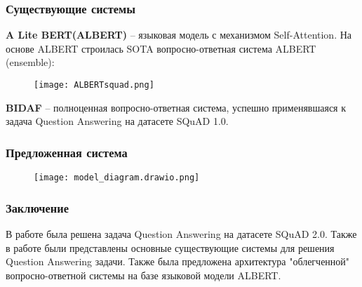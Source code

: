 \documentclass[xcolor={dvipsnames}]{beamer}
\begin{document}
\begin{frame}
\frametitle{Существующие системы}
\textbf{A Lite BERT(ALBERT)} -- языковая модель с механизмом Self-Attention. На основе ALBERT строилась SOTA вопросно-ответная система ALBERT (ensemble):

\begin{figure}[!ht]
    \centering
    \texttt{[image: ALBERTsquad.png]}
\end{figure}

\textbf{BIDAF} -- полноценная вопросно-ответная система, успешно применявшаяся к задача Question Answering на датасете SQuAD 1.0.
\end{frame}

\begin{frame}
\frametitle{Предложенная система}
\begin{figure}[!ht]
    \centering
    \texttt{[image: model\_diagram.drawio.png]}
\end{figure}
\end{frame}

\begin{frame}
\frametitle{Заключение}
В работе была решена задача Question Answering на датасете SQuAD 2.0. Также в работе были представлены основные существующие системы для решения Question Answering задачи. Также была предложена архитектура "облегченной" вопросно-ответной системы на базе языковой модели ALBERT.
\end{frame}
\end{document}
